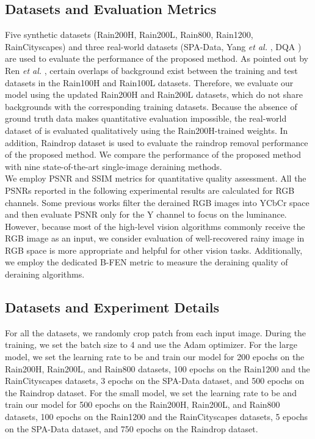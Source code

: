 \documentclass[a4paper,fleqn]{cas-dc}
\begin{document}
\label{sec:exp}






\subsection{Datasets and Evaluation Metrics}



Five synthetic datasets (Rain200H, Rain200L, Rain800, Rain1200, RainCityscapes) and three real-world datasets (SPA-Data, Yang \textit{et al.} \cite{yang2017deep}, DQA \cite{wu2020subjective})  are used to evaluate the performance of the proposed method. As pointed out by Ren \textit{et al.} \cite{ren2019progressive}, certain overlaps of background exist between the training and test datasets in the Rain100H and Rain100L datasets. Therefore, we evaluate our model using the updated Rain200H and Rain200L datasets, which do not share backgrounds with the corresponding training datasets.
Because the absence of ground truth data makes quantitative evaluation impossible, the real-world dataset of \cite{yang2017deep} is evaluated qualitatively using the Rain200H-trained weights. 
In addition, Raindrop \cite{qian2018attentive} dataset is used to evaluate the raindrop removal performance of the proposed method. We compare the performance of the proposed method with nine state-of-the-art single-image deraining methods. \\
We employ PSNR and SSIM \cite{wang2004image} metrics for quantitative quality
assessment. All the PSNRs reported in the following experimental results are calculated for RGB channels. Some previous works filter the derained RGB images into YCbCr space and then evaluate PSNR only for the Y channel to focus on the luminance. However, because most of the high-level vision algorithms commonly receive the RGB image as an input, we consider evaluation of well-recovered rainy image in RGB space is more appropriate and helpful for other vision tasks. Additionally, we employ the dedicated B-FEN metric \cite{wu2020subjective} to measure the deraining quality of deraining algorithms. 



\subsection{Datasets and Experiment Details}

For all the datasets, we randomly crop  patch from each input image. During the training, we set the batch size to 4 and use the Adam optimizer.
For the large model, we set the learning rate to be  and train our model for 200 epochs on the Rain200H, Rain200L, and Rain800 datasets, 100 epochs on the Rain1200 and the RainCityscapes datasets, 3 epochs on the SPA-Data dataset, and 500 epochs on the Raindrop dataset. For the small model, we set the learning rate to be   and train our model for 500 epochs on the Rain200H, Rain200L, and Rain800 datasets, 100 epochs on the Rain1200 and the RainCityscapes datasets, 5 epochs on the SPA-Data dataset, and 750 epochs on the Raindrop dataset. 
\end{document}

